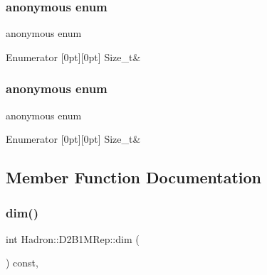 \subsubsection{\texorpdfstring{anonymous enum}{anonymous enum}}
{\footnotesize\ttfamily anonymous enum}

\begin{DoxyEnumFields}{Enumerator}
[0pt][0pt]{}\mbox{\label{structHadron_1_1D2B1MRep_a1497aa81e0780b3fbdc63753ff722792a1939ccd29479d61388485abdfcdc5e5c}} 
Size\+\_\+t&\\
\hline

\end{DoxyEnumFields}
\mbox{\label{structHadron_1_1D2B1MRep_a1497aa81e0780b3fbdc63753ff722792}} 
\subsubsection{\texorpdfstring{anonymous enum}{anonymous enum}}
{\footnotesize\ttfamily anonymous enum}

\begin{DoxyEnumFields}{Enumerator}
[0pt][0pt]{}\mbox{\label{structHadron_1_1D2B1MRep_a1497aa81e0780b3fbdc63753ff722792a1939ccd29479d61388485abdfcdc5e5c}} 
Size\+\_\+t&\\
\hline

\end{DoxyEnumFields}


\subsection{Member Function Documentation}
\mbox{\label{structHadron_1_1D2B1MRep_a8d1c9f35b426e8848c73fa423f4f2a4b}} 
\subsubsection{\texorpdfstring{dim()}{dim()}\hspace{0.1cm}{\footnotesize\ttfamily [1/2]}}
{\footnotesize\ttfamily int Hadron\+::\+D2\+B1\+M\+Rep\+::dim (\begin{DoxyParamCaption}{ }\end{DoxyParamCaption}) const\hspace{0.3cm}{\ttfamily [inline]}, {\ttfamily [virtual]}}

